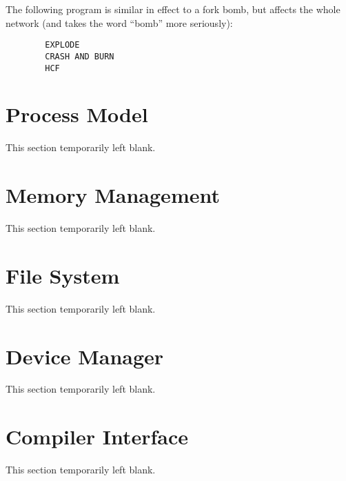 \documentclass[12pt,titlepage,a4paper,twoside]{article}
\begin{document}
The following program is similar in effect to a fork bomb, but affects the
whole network (and takes the word ``bomb'' more seriously):

\begin{verbatim}
        EXPLODE
        CRASH AND BURN
        HCF
\end{verbatim}


\section{Process Model}
\label{process model}

This section temporarily left blank.


\section{Memory Management}
\label{memory management}

This section temporarily left blank.


\section{File System}
\label{file system}

This section temporarily left blank.


\section{Device Manager}
\label{device manager}

This section temporarily left blank.


\section{Compiler Interface}
\label{compiler interface}

This section temporarily left blank.


\end{document}
